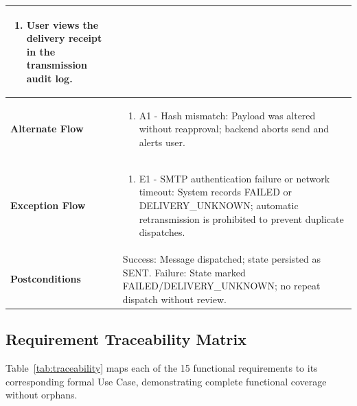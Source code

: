 \begin{longtable}{>{\raggedright\arraybackslash}p{}>{\raggedright\arraybackslash}p{}}
\begin{enumerate}[nosep,leftmargin=*,label=\arabic*.]
    \item User views the delivery receipt in the transmission audit log.

\end{enumerate} \\ \hline

\textbf{Alternate Flow} & \begin{enumerate}[nosep,leftmargin=*,label=\arabic*.]

    \item A1 - Hash mismatch: Payload was altered without reapproval; backend aborts send and alerts user.

\end{enumerate} \\ \hline

\textbf{Exception Flow} & \begin{enumerate}[nosep,leftmargin=*,label=\arabic*.]

    \item E1 - SMTP authentication failure or network timeout: System records FAILED or DELIVERY\_UNKNOWN; automatic retransmission is prohibited to prevent duplicate dispatches.

\end{enumerate} \\ \hline

\textbf{Postconditions} & Success: Message dispatched; state persisted as SENT. Failure: State marked FAILED/DELIVERY\_UNKNOWN; no repeat dispatch without review. \\ \hline

\end{longtable}

\endgroup







\subsection{Requirement Traceability Matrix}

\label{subsec:traceability-matrix}



Table~\ref{tab:traceability} maps each of the 15 functional requirements to its corresponding formal Use Case, demonstrating complete functional coverage without orphans.



